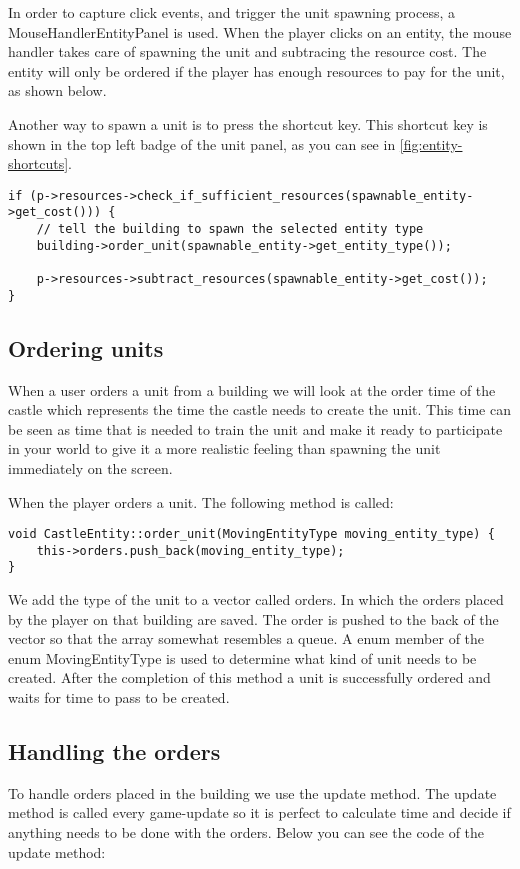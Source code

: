 In order to capture click events, and trigger the unit spawning process, a
MouseHandlerEntityPanel is used. When the player clicks on an entity, the mouse
handler takes care of spawning the unit and subtracing the resource cost. The
entity will only be ordered if the player has enough resources to pay for the
unit, as shown below.

Another way to spawn a unit is to press the shortcut key. This shortcut key is
shown in the top left badge of the unit panel, as you can see in
\cref{fig:entity-shortcuts}.

\begin{lstlisting} 
if (p->resources->check_if_sufficient_resources(spawnable_entity->get_cost())) {
    // tell the building to spawn the selected entity type
    building->order_unit(spawnable_entity->get_entity_type());
    
    p->resources->subtract_resources(spawnable_entity->get_cost()); 
}
\end{lstlisting}

\subsection{Ordering units} 
When a user orders a unit from a building we will look at the order time of 
the castle which represents the time the castle needs to create the unit. This 
time can be seen as time that is needed to train the unit and make it ready to 
participate in your world to give it a more realistic feeling than spawning 
the unit immediately on the screen. 

When the player orders a unit. The following method is called:

\begin{lstlisting} 
void CastleEntity::order_unit(MovingEntityType moving_entity_type) { 
    this->orders.push_back(moving_entity_type); 
}
\end{lstlisting}

We add the type of the unit to a vector called orders. In which the orders
placed by the player on that building are saved. The order is pushed to the
back of the vector so that the array somewhat resembles a queue. A enum member
of the enum MovingEntityType is used to determine what kind of unit needs to be
created. After the completion of this method a unit is successfully ordered and
waits for time to pass to be created.

\subsection{Handling the orders} 
To handle orders placed in the building we use the update method. The update 
method is called every game-update so it is perfect to calculate time and 
decide if anything needs to be done with the orders. Below you can see the 
code of the update method:

